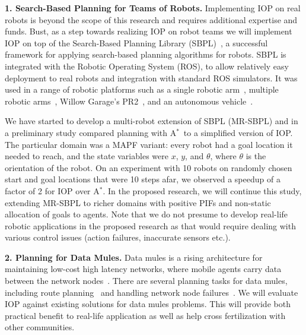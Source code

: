 \documentclass[11pt]{article}
\newcommand{\astar}{A$^*$}
\begin{document}
{\bf 1. Search-Based Planning for Teams of Robots.}
Implementing IOP on real robots is beyond the scope of this research and requires additional expertise and funds. Bust, as a step towards realizing IOP on robot teams we will implement IOP on top of the Search-Based Planning Library (SBPL)~\cite{likhachev2010sbpl}, a successful framework for applying search-based planning algorithms for robots. 
SBPL is integrated with the Robotic Operating System (ROS), to allow relatively easy deployment to real robots and integration with standard ROS simulators. It was used in a range of robotic platforms such as a single robotic arm~\cite{stern2014potential,aine2015learning}, multiple robotic arms~\cite{cohen2014planning}, Willow Garage’s PR2~\cite{phillips2012graphs}, and an autonomous vehicle~\cite{likhachev2009planning}. 

We have started to develop a multi-robot extension of SBPL (MR-SBPL) and in a preliminary study compared planning with \astar\ to a simplified version of IOP. The particular domain was a MAPF variant: every robot had a goal location it needed to reach, and the state variables were $x$, $y$, and $\theta$, where $\theta$ is the orientation of the robot. On an experiment with 10 robots on randomly chosen start and goal locations that were 10 steps afar, we observed a speedup of a factor of 2 for IOP over \astar . In the proposed research, we will continue this study, extending MR-SBPL to richer domains with positive PIFs and non-static allocation of goals to agents. Note that we do not presume to develop real-life robotic applications in the proposed research as that would require dealing with various control issues (action failures, inaccurate sensors etc.). 

{\bf 2. Planning for Data Mules.} Data mules is a rising architecture for maintaining low-cost high latency networks, where mobile agents carry data between the network nodes~\cite{shah2003data}. %
There are several planning tasks for data mules, including route planning~\cite{sugihara2011path} and handling network node failures~\cite{crowcroft2016using}. We will evaluate IOP against existing solutions for data mules problems. This will provide both practical benefit to real-life application as well as help cross fertilization with other communities.
\end{document}
